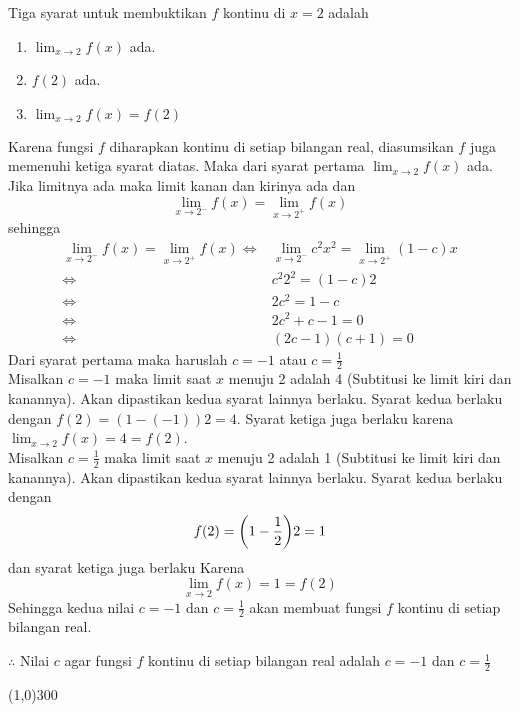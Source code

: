 \begin{enumerate}[leftmargin=*, label={\arabic*}.]
\begin{enumerate}[label={\alph*}.]
    Tiga syarat untuk membuktikan $f$ kontinu di $x=2$ adalah
        \begin{enumerate}[label={\arabic*}.]
        \item $\lim_{x\to 2} f(x)$ ada.
        \item $f(2)$ ada.
        \item $\lim_{x\to 2} f(x) = f(2)$
        \end{enumerate}
    Karena fungsi $f$ diharapkan kontinu di setiap bilangan real, diasumsikan $f$ 
    juga memenuhi ketiga syarat diatas. Maka dari syarat pertama $\lim_{x\to 2} f(x)$ 
    ada. Jika limitnya ada maka limit kanan dan kirinya ada dan 
    \[
    \lim_{x\to 2^{-}} f(x) = \lim_{x\to 2^{+}} f(x)
    \]
    sehingga
    \begin{align*}
        \lim_{x\to 2^{-}} f(x) = \lim_{x\to 2^{+}} f(x)
        \iff &\lim_{x\to 2^{-}} c^{2}x^{2} = \lim_{x\to 2^{+}} (1-c)x\\
        \iff &c^{2}2^{2} = (1-c)2\\
        \iff &2c^{2} = 1-c\\
        \iff &2c^{2}+c-1 = 0\\
        \iff &(2c-1)(c+1) = 0
    \end{align*}
    Dari syarat pertama maka haruslah $c=-1$ atau $c=\frac{1}{2}$\\
    Misalkan $c=-1$ maka limit saat $x$ menuju 2 adalah 4 (Subtitusi ke limit kiri dan 
    kanannya). Akan dipastikan kedua syarat lainnya berlaku. Syarat kedua berlaku 
    dengan $f(2) = (1-(-1))2 = 4$. Syarat ketiga juga berlaku karena 
    $\lim_{x\to 2} f(x) = 4 = f(2)$.\\
    Misalkan $c=\frac{1}{2}$ maka limit saat $x$ menuju 2 adalah 1 (Subtitusi ke limit 
    kiri dan kanannya). Akan dipastikan kedua syarat lainnya berlaku. Syarat kedua berlaku 
    dengan
    \[
        f(2) = \brk*{1-\frac{1}{2}}2 = 1
    \] 
    dan syarat ketiga juga berlaku Karena
    \[
        \lim_{x\to 2} f(x) = 1 = f(2)
    \] 
    Sehingga kedua nilai $c=-1$ dan $c=\frac{1}{2}$ akan membuat fungsi $f$ 
    kontinu di setiap bilangan real.

    $\therefore$ Nilai $c$ agar fungsi $f$ kontinu di setiap bilangan real adalah $c=-1$ 
    dan $c=\frac{1}{2}$
    
    \end{enumerate}
\end{enumerate}

\begin{center}\line(1,0){300}\end{center}
